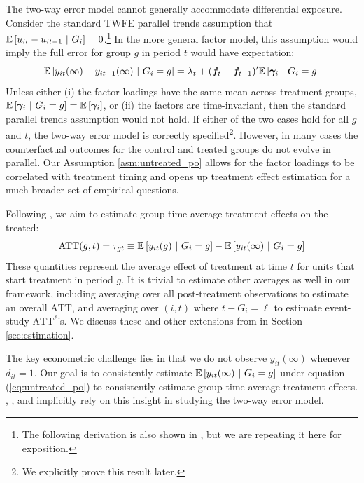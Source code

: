 \documentclass[12pt]{article}
\def\ATT{\text{ATT}}
\begin{document}
The two-way error model cannot generally accommodate differential exposure. Consider the standard TWFE parallel trends assumption that $\mathbb{E}\left[u_{it} - u_{it-1} \ \vert \ G_i\right] = 0$.\footnote{The following derivation is also shown in \citet{Callaway_Karami_2020}, but we are repeating it here for exposition.} In the more general factor model, this assumption would imply the full error for group $g$ in period $t$ would have expectation:
\begin{equation*}
  \mathbb{E}\left[y_{it}(\infty) - y_{it-1}(\infty) \ \vert \ G_i = g\right] = \lambda_t + (\bm f_t - \bm f_{t-1})' \mathbb{E}\left[\bm \gamma_i \ \vert \ G_i = g\right]
\end{equation*}
Unless either (i) the factor loadings have the same mean across treatment groups, $\mathbb{E}\left[\bm \gamma_i \ \vert \ G_i = g\right] = \mathbb{E}\left[\bm \gamma_i\right]$, or (ii) the factors are time-invariant, then the standard parallel trends assumption would not hold. If either of the two cases hold for all $g$ and $t$, the two-way error model is correctly specified\footnote{We explicitly prove this result later.}. However, in many cases the counterfactual outcomes for the control and treated groups do not evolve in parallel. Our Assumption \ref{asm:untreated_po} allows for the factor loadings to be correlated with treatment timing and opens up treatment effect estimation for a much broader set of empirical questions.

Following \citet{}, we aim to estimate group-time average treatment effects on the treated:
\begin{equation}
  \ATT(g,t) = \tau_{gt} \equiv \condexpec{y_{it}(g)}{G_i = g} - \condexpec{y_{it}(\infty)}{G_i = g}
\end{equation}
These quantities represent the average effect of treatment at time $t$ for units that start treatment in period $g$. It is trivial to estimate other averages as well in our framework, including averaging over all post-treatment observations to estimate an overall $\ATT$, and averaging over $(i,t)$ where $t - G_i = \ell$ to estimate event-study $\ATT^\ell$'s. We discuss these and other extensions from \citet{Callaway_Santanna_2021} in Section \ref{sec:estimation}.

The key econometric challenge lies in that we do not observe $y_{it}(\infty)$ whenever $d_{it} = 1$. Our goal is to consistently estimate $\mathbb{E}\left[y_{it}(\infty) \ \vert \ G_i = g\right]$ under equation (\ref{eq:untreated_po}) to consistently estimate group-time average treatment effects. \citet{Gardner_2021}, \citet{Wooldridge_2021}, and \citet{Borusyak_Jaravel_Spiess_2021} implicitly rely on this insight in studying the two-way error model. 
\end{document}
